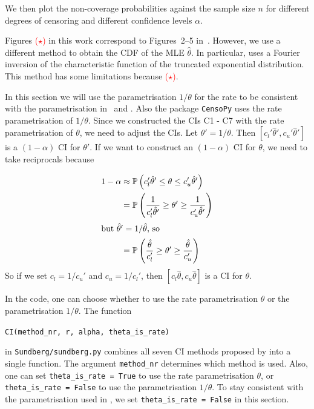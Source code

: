 We then plot the non-coverage probabilities against the sample size $n$ for different degrees of censoring and different confidence levels $\alpha$.

Figures \textcolor{red}{($\star$)} in this work correspond to Figures~2--5 in~\cite{Sundberg2001}. However, we use a different method to obtain the CDF of the MLE $\hat{\theta}$. In particular, \cite{Sundberg2001} uses a Fourier inversion of the characteristic function of the truncated exponential distribution. This method has some limitations because \textcolor{red}{($\star$)}.

In this section we will use the parametrisation $1 / \theta$ for the rate to be consistent with the parametrisation in~\cite{Sundberg2001} and \cite{Cramer2026a}. Also the package \texttt{CensoPy} uses the rate parametrisation of $1 / \theta$. Since we constructed the CIs C1 - C7 with the rate parametrisation of $\theta$, we need to adjust the CIs. 
Let $\theta' = 1 / \theta$. Then $[c_l' \hat \theta', c_u' \hat \theta']$ is a $(1 - \alpha)$ CI for $\theta'$. If we want to construct an $(1- \alpha)$ CI for $\theta$, we need to take reciprocals because 

\begin{align}
	1 - \alpha 
	&\approx
	\mathbb{P} \left(c_l' \hat \theta' \leq \theta\leq c_u' \hat \theta' \right) \\
	&=
	\mathbb{P} \left(\frac{1}{c_l' \hat \theta'} \geq \theta' \geq \frac{1}{c_u' \hat \theta'} \right) \\
\intertext{but $\hat \theta' = 1 / \hat \theta$, so}
	&=
	\mathbb{P} \left(\frac{\hat \theta}{c_l'} \geq \theta' \geq \frac{\hat \theta}{c_u'} \right)
\end{align}
So if we set $c_l = 1 / c_u'$ and $c_u = 1 / c_l'$, then $[c_l \hat \theta, c_u \hat \theta]$ is a CI for $\theta$. 

In the code, one can choose whether to use the rate parametrisation $\theta$ or the parametrisation $1/\theta$.
The function 

\texttt{CI(method\_nr, r, alpha, theta\_is\_rate)} 

in \texttt{Sundberg\slash sundberg.py} combines all seven CI methods proposed by \cite{Sundberg2001} into a single function. The argument \texttt{method\_nr} determines which method is used.
Also, one can set \texttt{theta\_is\_rate = True} to use the rate parametrisation $\theta$, or \texttt{theta\_is\_rate = False} to use the parametrisation $1/\theta$. To stay consistent with the parametrisation used in \cite{Cramer2026a}, we set \texttt{theta\_is\_rate = False} in this section.


